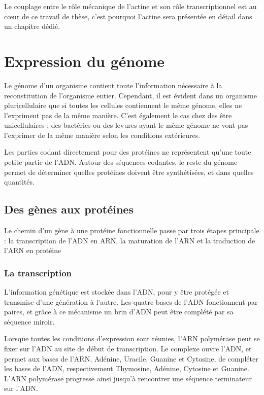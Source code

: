 Le couplage entre le rôle mécanique de l'actine et son rôle transcriptionnel est au c\oe ur de ce travail de thèse, c'est pourquoi l'actine sera présentée en détail dans un chapitre dédié. 




\section{Expression du génome}

Le génome d'un organisme contient toute l'information nécessaire à la reconstitution de l'organisme entier. Cependant, il est évident dans un organisme pluricellulaire que si toutes les cellules contiennent le même génome, elles ne l'expriment pas de la même manière. C'est également le cas chez des être unicellulaires : des bactéries ou des levures ayant le même génome ne vont pas l'exprimer de la même manière selon les conditions extérieures. 

Les parties codant directement pour des protéines ne représentent qu'une toute petite partie de l'ADN. Autour des séquences codantes, le reste du génome permet de déterminer quelles protéines doivent être synthétisées, et dans quelles quantités. 

\subsection{Des gènes aux protéines}

Le chemin d'un gène à une protéine fonctionnelle passe par trois étapes principale : la transcription de l'ADN en ARN, la maturation de l'ARN et la traduction de l'ARN en protéine 

\subsubsection{La transcription}

L'information génétique est stockée dans l'ADN, pour y être protégée et transmise d'une génération à l'autre. Les quatre bases de l'ADN fonctionnent par paires, et grâce à ce mécanisme un brin d'ADN peut être complété par sa séquence miroir. 

Lorsque toutes les conditions d'expression sont réunies, l'ARN polymérase peut se fixer sur l'ADN au site de début de transcription. Le complexe ouvre l'ADN, et permet aux bases de l'ARN, Adénine, Uracile, Guanine et Cytosine, de compléter les bases de l'ADN, respectivement Thymosine, Adénine, Cytosine et Guanine. L'ARN polymérase progresse ainsi jusqu'à rencontrer une séquence terminateur sur l'ADN. 

